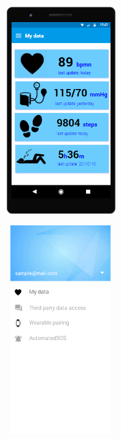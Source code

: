 \begin{figure}[H]
\centering
\begin{minipage}{.5\textwidth}
  \centering
  \includegraphics[width=5cm,height=9cm]{resources/Screen/IndividualMyData.png}
  \label{fig:App data homepage}
\end{minipage}%
\begin{minipage}{.5\textwidth}
  \centering
  \includegraphics[width=5cm,height=9cm]{resources/Screen/menuindividual.png}
  \label{fig:App Side menu}
\end{minipage}
\end{figure}


